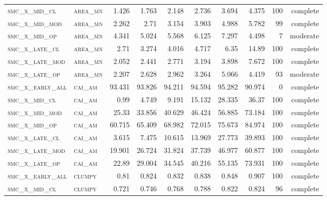 \begin{landscape}
\begin{center}
\begin{footnotesize}
\begin{longtable}{llrrrrr|rrr}
\textsc{smc\_x\_mid\_cl   } & \textsc{area\_mn  }   & 1.426    & 1.763    & 2.148    & 2.736    & 3.694    & 4.375    & 100 & complete \\
\textsc{smc\_x\_mid\_mod  } & \textsc{area\_mn  }   & 2.262    & 2.71     & 3.154    & 3.903    & 4.988    & 5.782    & 99  & complete \\
\textsc{smc\_x\_mid\_op   } & \textsc{area\_mn  }   & 4.341    & 5.024    & 5.568    & 6.125    & 7.297    & 4.498    & 7   & moderate \\
\textsc{smc\_x\_late\_cl  } & \textsc{area\_mn  }   & 2.71     & 3.274    & 4.016    & 4.717    & 6.35     & 14.89    & 100 & complete \\
\textsc{smc\_x\_late\_mod } & \textsc{area\_mn  }   & 2.052    & 2.441    & 2.771    & 3.194    & 3.898    & 7.672    & 100 & complete \\
\textsc{smc\_x\_late\_op  } & \textsc{area\_mn  }   & 2.207    & 2.628    & 2.962    & 3.264    & 5.066    & 4.419    & 93  & moderate \\
\textsc{smc\_x\_early\_all} & \textsc{cai\_am   }   & 93.431   & 93.826   & 94.211   & 94.594   & 95.282   & 90.974   & 0   & complete \\
\textsc{smc\_x\_mid\_cl   } & \textsc{cai\_am   }   & 0.99     & 4.749    & 9.191    & 15.132   & 28.335   & 36.37    & 100 & complete \\
\textsc{smc\_x\_mid\_mod  } & \textsc{cai\_am   }   & 25.33    & 33.856   & 40.629   & 46.424   & 56.885   & 73.184   & 100 & complete \\
\textsc{smc\_x\_mid\_op   } & \textsc{cai\_am   }   & 60.715   & 65.409   & 68.982   & 72.015   & 75.673   & 84.974   & 100 & complete \\
\textsc{smc\_x\_late\_cl  } & \textsc{cai\_am   }   & 3.615    & 7.475    & 10.615   & 13.969   & 27.773   & 39.893   & 100 & complete \\
\textsc{smc\_x\_late\_mod } & \textsc{cai\_am   }   & 19.901   & 26.724   & 31.824   & 37.739   & 46.977   & 60.877   & 100 & complete \\
\textsc{smc\_x\_late\_op  } & \textsc{cai\_am   }   & 22.89    & 29.004   & 34.545   & 40.216   & 55.135   & 73.931   & 100 & complete \\
\textsc{smc\_x\_early\_all} & \textsc{clumpy    }   & 0.81     & 0.824    & 0.832    & 0.838    & 0.848    & 0.907    & 100 & complete \\
\textsc{smc\_x\_mid\_cl   } & \textsc{clumpy    }   & 0.721    & 0.746    & 0.768    & 0.788    & 0.822    & 0.824    & 96  & complete \\

\end{longtable}
\end{footnotesize}
\end{center}
\end{landscape}

